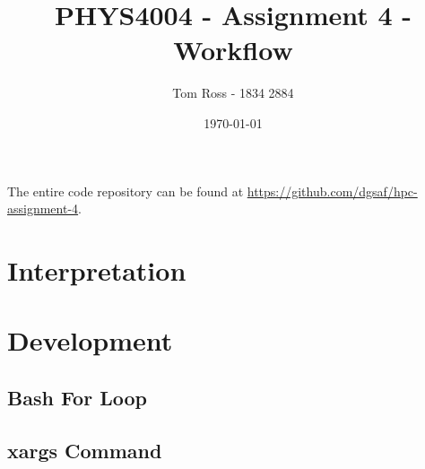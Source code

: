 \documentclass{article}
\title{PHYS4004 - Assignment 4 - Workflow}
\author{Tom Ross - 1834 2884}
\date{\today}
\begin{document}
The entire code repository can be found at
\url{https://github.com/dgsaf/hpc-assignment-4}.

\tableofcontents

\listoffigures

\listoftables

\clearpage

\section{Interpretation}
\label{sec:interpretation}



\clearpage

\section{Development}
\label{sec:development}



\subsection{Bash For Loop}
\label{sec:bash-for-loop}



\subsection{xargs Command}
\label{sec:xargs-command}


\end{document}
